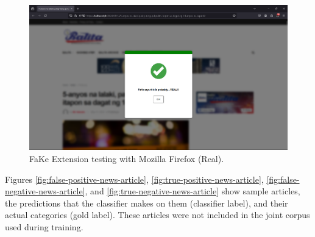         \begin{figure}[h!]
            \centering
            \includegraphics[width=1\textwidth,height=1\textheight, keepaspectratio]{figures/Screenshots/firefox-true-negative.png}
            \caption{FaKe Extension testing with Mozilla Firefox (Real).}
            \label{fig:real-firefox-test}
        \end{figure}

        Figures \ref{fig:false-positive-news-article}, \ref{fig:true-positive-news-article}, \ref{fig:false-negative-news-article}, and \ref{fig:true-negative-news-article} show sample articles, the predictions that the classifier makes on them (classifier label), and their actual categories (gold label). These articles were not included in the joint corpus used during training.

